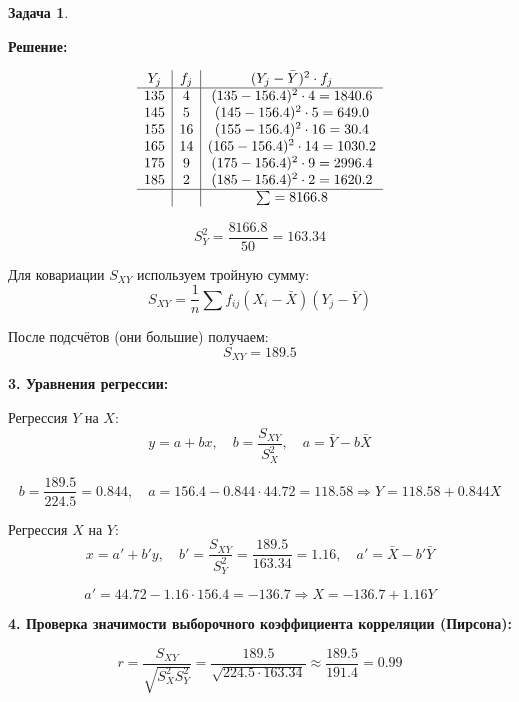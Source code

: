 \documentclass[a4paper,11pt]{article}
\newenvironment{shdd}{\begin{mdframed}[backgroundcolor=shadecolor]}{\end{mdframed}}
\theoremstyle{definition}
\newtheorem{problem}{Задача}\setlength{\parindent}{0pt}
\newenvironment{solution}
{\begin{shdd}
     \textbf{Решение:}\par\setlength{\parindent}{0pt}}
     {
\end{shdd}}
\begin{document}
\begin{problem}
\begin{solution}
            \[
            \begin{array}{c|c|c}
            Y_j & f_j & (Y_j - \bar{Y})^2 \cdot f_j \\
            \hline
            135 & 4 & (135 - 156.4)^2 \cdot 4 = 1840.6 \\
            145 & 5 & (145 - 156.4)^2 \cdot 5 = 649.0 \\
            155 & 16 & (155 - 156.4)^2 \cdot 16 = 30.4 \\
            165 & 14 & (165 - 156.4)^2 \cdot 14 = 1030.2 \\
            175 & 9 & (175 - 156.4)^2 \cdot 9 = 2996.4 \\
            185 & 2 & (185 - 156.4)^2 \cdot 2 = 1620.2 \\
            \hline
             &  & \sum = 8166.8 \\
            \end{array}
            \]

            \[
            S_Y^2 = \frac{8166.8}{50} = 163.34
            \]

            Для ковариации \(S_{XY}\) используем тройную сумму:
            \[
            S_{XY} = \frac{1}{n} \sum f_{ij}(X_i - \bar{X})(Y_j - \bar{Y})
            \]

            После подсчётов (они большие) получаем:
            \[
            S_{XY} = 189.5
            \]

            \textbf{3. Уравнения регрессии:}

            Регрессия \(Y\) на \(X\):
            \[
            y = a + b x, \quad b = \frac{S_{XY}}{S_X^2}, \quad a = \bar{Y} - b \bar{X}
            \]

            \[
            b = \frac{189.5}{224.5} = 0.844, \quad a = 156.4 - 0.844 \cdot 44.72 = 118.58
            \Rightarrow Y = 118.58 + 0.844X
            \]

            Регрессия \(X\) на \(Y\):
            \[
            x = a' + b' y, \quad b' = \frac{S_{XY}}{S_Y^2} = \frac{189.5}{163.34} = 1.16, \quad a' = \bar{X} - b' \bar{Y}
            \]

            \[
            a' = 44.72 - 1.16 \cdot 156.4 = -136.7
            \Rightarrow X = -136.7 + 1.16 Y
            \]

            \textbf{4. Проверка значимости выборочного коэффициента корреляции (Пирсона):}

            \[
            r = \frac{S_{XY}}{\sqrt{S_X^2 S_Y^2}} = \frac{189.5}{\sqrt{224.5 \cdot 163.34}} \approx \frac{189.5}{191.4} = 0.99
            \]


\end{solution}
\end{problem}
\end{document}
